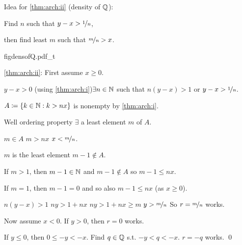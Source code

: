 \documentclass[10pt,aspectratio=169]{beamer}
\begin{document}
\begin{frame}
Idea for \eqref{thm:arch:ii} (density of ${\mathbb{Q}}$):

\medskip

Find $n$ such that $y-x > \nicefrac{1}{n}$,

\medskip

then find least $m$ such that $\nicefrac{m}{n} > x$.

\vspace*{-0.5in}
\hspace*{2.0in}%
{figdensofQ.pdf_t}

\vspace*{-0.3in}
\pause

\eqref{thm:arch:ii}:
First assume $x \geq 0$.

\medskip
\pause

$y-x > 0$ \quad (using \eqref{thm:arch:i})\thus \quad $\exists n \in {\mathbb{N}}$ such that
\quad
$n(y-x) > 1$
\quad or \quad
$y-x > \nicefrac{1}{n}$.

\medskip
\pause

$A \coloneqq \{ k \in {\mathbb{N}} : k > nx \}$ is nonempty by \eqref{thm:arch:i}.

\medskip
\pause

Well ordering property \wthus $\exists$ a least element $m$ of $A$.

\medskip
\pause

$m \in A$ \wthus $m > nx$ \wthus $x < \nicefrac{m}{n}$.

\medskip
\pause

$m$ is the least element \wthus $m-1 \notin A$.

\medskip
\pause

If $m > 1$, then $m-1 \in {\mathbb{N}}$ and $m-1 \notin A$ so \quad $m-1 \leq nx$.

\pause

If $m = 1$, then $m-1 = 0$ and so also \quad $m-1 \leq nx$ \quad (as $x \geq 0$).

%

\medskip
\pause

$n(y-x) > 1$ \wthus $ny > 1+nx$
\pause
\wthus
$ny > 1+nx \geq m$
\pause
\wthus
$y > \nicefrac{m}{n}$
\pause
\qquad
So $r=\nicefrac{m}{n}$ works.

\medskip
\pause

Now assume $x < 0$.  \qquad\pause  If $y > 0$, then $r=0$ works.

\medskip
\pause

If $y \leq 0$, then $0 \leq -y < -x$.
\quad \pause
Find $q\in {\mathbb{Q}}$ s.t. $-y < q < -x$.
\quad \pause  $r = -q$ works.
\qed

\end{frame}
\end{document}
